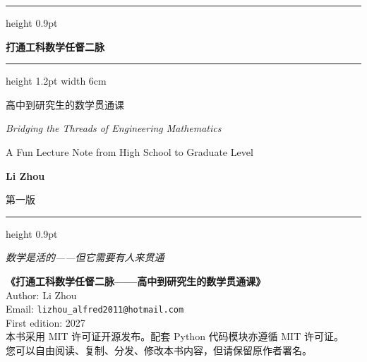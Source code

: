 \documentclass[11pt,a4paper,openany]{book}
\theoremstyle{definition}
\theoremstyle{remark}
\begin{document}

\begin{titlepage}
\centering
\vspace*{3.2cm}

{\color{titleline}\hrule height 0.9pt}
\vspace{1.0cm}

{\Huge\bfseries\color{titleline} 打通工科数学任督二脉 \par}
\vspace{0.6cm}

{\color{titlegold}\hrule height 1.2pt width 6cm}
\vspace{0.8cm}

{\Large 高中到研究生的数学贯通课 \par}
\vspace{0.5cm}

{\Large\itshape Bridging the Threads of Engineering Mathematics \par}
\vspace{0.15cm}
{\large A Fun Lecture Note from High School to Graduate Level \par}

\vspace{2.5cm}

{\Large\color{titlegold}\bfseries Li Zhou \par}

\vspace{1.2cm}

{\normalsize 第一版  \par}

\vfill

{\color{titleline}\hrule height 0.9pt}
\vspace{0.8cm}

{\normalsize\itshape 数学是活的——但它需要有人来贯通 \par}

\vspace{1cm}
\end{titlepage}

\clearpage
\thispagestyle{empty}
\noindent\textbf{《打通工科数学任督二脉——高中到研究生的数学贯通课》}\\[4pt]
Author: Li Zhou\\
Email: \texttt{lizhou\_alfred2011@hotmail.com}\\
First edition: 2027\\[8pt]
本书采用 MIT 许可证开源发布。配套 Python 代码模块亦遵循 MIT 许可证。\\
您可以自由阅读、复制、分发、修改本书内容，但请保留原作者署名。\\[16pt]
\end{document}
